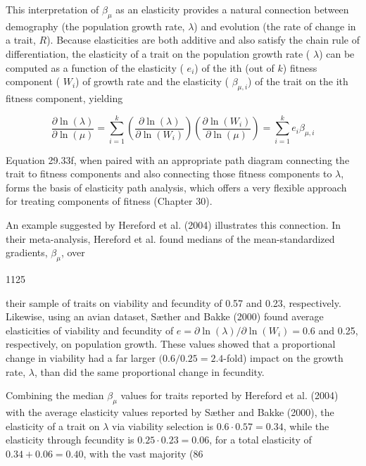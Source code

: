 \documentclass{article}
\begin{document}
This interpretation of  $ \beta_{\mu} $ as an elasticity provides a natural connection between demography (the population growth rate,  $ \lambda $) and evolution (the rate of change in a trait,  $ R $). Because elasticities are both additive and also satisfy the chain rule of differentiation, the elasticity of a trait on the population growth rate ( $ \lambda $) can be computed as a function of the elasticity ( $ e_i $) of the ith (out of  $ k $) fitness component ( $ W_i $) of growth rate and the elasticity ( $ \beta_{\mu,i} $) of the trait on the ith fitness component, yielding

\begin{equation}
\frac{\partial\ln(\lambda)}{\partial\ln(\mu)}=\sum_{i=1}^{k}\left(\frac{\partial\ln(\lambda)}{\partial\ln(W_{i})}\right)\left(\frac{\partial\ln(W_{i})}{\partial\ln(\mu)}\right)=\sum_{i=1}^{k}e_{i}\beta_{\mu,i}
\tag{29.33f}
\label{eq:29_33f}
\end{equation}

Equation 29.33f, when paired with an appropriate path diagram connecting the trait to fitness components and also connecting those fitness components to  $ \lambda $, forms the basis of elasticity path analysis, which offers a very flexible approach for treating components of fitness (Chapter 30).

An example suggested by Hereford et al. (2004) illustrates this connection. In their meta-analysis, Hereford et al. found medians of the mean-standardized gradients,  $ \beta_{\mu} $, over

1125

their sample of traits on viability and fecundity of 0.57 and 0.23, respectively. Likewise, using an avian dataset, Sæther and Bakke (2000) found average elasticities of viability and fecundity of  $ e = \partial \ln(\lambda) / \partial \ln(W_i) = 0.6 $ and 0.25, respectively, on population growth. These values showed that a proportional change in viability had a far larger  $ (0.6 / 0.25 = 2.4 $-fold) impact on the growth rate,  $ \lambda $, than did the same proportional change in fecundity.

Combining the median  $ \beta_{\mu} $ values for traits reported by Hereford et al. (2004) with the average elasticity values reported by Sæther and Bakke (2000), the elasticity of a trait on  $ \lambda $ via viability selection is  $ 0.6 \cdot 0.57 = 0.34 $, while the elasticity through fecundity is  $ 0.25 \cdot 0.23 = 0.06 $, for a total elasticity of  $ 0.34 + 0.06 = 0.40 $, with the vast majority (86%
\end{document}
